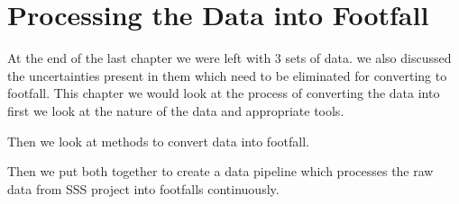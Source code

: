 \chapter{Processing the Data into Footfall} \label{chapter:processing}

At the end of the last chapter we were left with 3 sets of data.
we also discussed the uncertainties present in them which need to be eliminated for converting to footfall.
This chapter we would look at the process of converting the data into
first we look at the nature of the data and appropriate tools.

Then we look at methods to convert data into footfall.

Then we put both together to create a data pipeline which processes the raw data from SSS project into footfalls continuously.

\cleardoublepage


\cleardoublepage


\cleardoublepage

